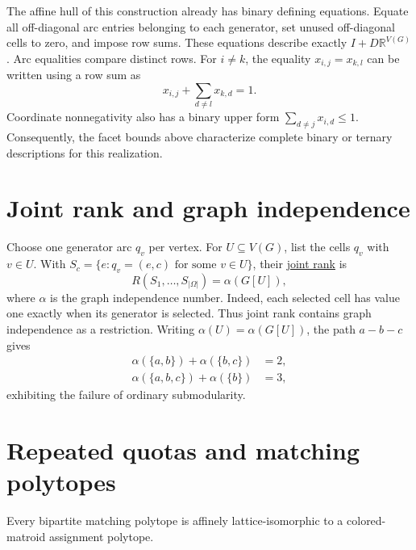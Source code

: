 The affine hull of this construction already has binary defining
equations. Equate all off-diagonal arc entries belonging to each
generator, set unused off-diagonal cells to zero, and impose row sums.
These equations describe exactly $I+D\mathbb R^{V(G)}$.
Arc equalities compare distinct rows. For $i\ne k$, the equality
$x_{i,j}=x_{k,l}$ can be written using a row sum as
\[
 x_{i,j}+\sum_{d\ne l}x_{k,d}=1.
\]
Coordinate nonnegativity also has a binary upper form
$\sum_{d\ne j}x_{i,d}\leq1$.
Consequently, the facet bounds above characterize complete binary or
ternary descriptions for this realization.

\section[stableSetRank]{Joint rank and graph independence}

Choose one generator arc $q_v$ per vertex. For $U\subseteq V(G)$,
list the cells $q_v$ with $v\in U$. With
$S_c=\{e:q_v=(e,c)\text{ for some }v\in U\}$, their
\href{rank-flats.htm#jointRank}{joint rank} is
\[
 R(S_1,\dotsc,S_{|\Omega|})=\alpha(G[U]),
\]
where $\alpha$ is the graph independence number. Indeed, each selected
cell has value one exactly when its generator is selected.
Thus joint rank contains graph independence as a restriction.
Writing $\alpha(U)=\alpha(G[U])$, the path $a-b-c$ gives
\[
 \begin{aligned}
 \alpha(\{a,b\})+\alpha(\{b,c\})&=2,\\
 \alpha(\{a,b,c\})+\alpha(\{b\})&=3,
 \end{aligned}
\]
exhibiting the failure of ordinary submodularity.

\section[matchingPolytopes]{Repeated quotas and matching polytopes}

\begin{theorem}
Every bipartite matching polytope is affinely lattice-isomorphic to
a colored-matroid assignment polytope.
\end{theorem}

